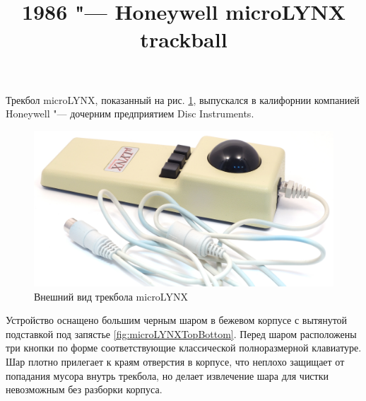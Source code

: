\documentclass[11pt, a4paper]{article}
\begin{document}
\title{1986 "--- Honeywell microLYNX trackball}
\date{}
\maketitle

Трекбол microLYNX, показанный на рис. \ref{fig:microLYNXPic}, выпускался в калифорнии компанией Honeywell "--- дочерним предприятием Disc Instruments.


\begin{figure}[h]
    \centering
    \includegraphics[scale=0.4]{1986_honeywell_microlynx_trackball/pic_60.jpg}
    \caption{Внешний вид трекбола microLYNX}
    \label{fig:microLYNXPic}
\end{figure}

Устройство оснащено большим черным шаром в бежевом корпусе с вытянутой подставкой
под запястье \ref{fig:microLYNXTopBottom}. Перед шаром расположены три кнопки по форме соответствующие классической полноразмерной клавиатуре. Шар плотно прилегает к краям отверстия в корпусе, что неплохо защищает от попадания мусора внутрь трекбола, но делает извлечение шара для чистки невозможным без разборки корпуса.
\end{document}
